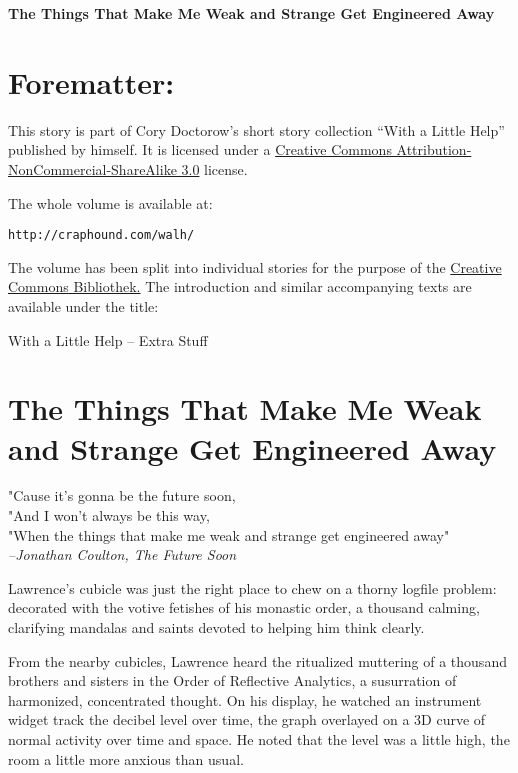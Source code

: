 


\begin{center}
\textbf{\huge\textsf{The Things That Make Me Weak and Strange Get 
Engineered Away}}
\end{center}

\section{Forematter:}
This story is part of Cory Doctorow’s short story collection
“With a Little Help” published by himself. It is licensed under a
\href{http://creativecommons.org/licenses/by-nc-sa/}
{Creative Commons Attribution-NonCommercial-ShareAlike 3.0} license.

The whole volume is available at:

\texttt{http://craphound.com/walh/}

The volume has been split into individual stories for the purpose of the
\href{http://ccbib.org}{Creative Commons Bibliothek.}
The introduction and similar accompanying texts are available under the 
title:
\begin{center}
With a Little Help -- Extra Stuff
\end{center}

\newpage
\section{The Things That Make Me Weak and Strange Get Engineered Away}

\begin{flushleft}
\textsf{
"Cause it's gonna be the future soon,\\
"And I won't always be this way,\\
"When the things that make me weak and strange get engineered away"\\
}
\hfill \textit{--Jonathan Coulton, The Future Soon}
\end{flushleft}

Lawrence's cubicle was just the right place to chew on a thorny logfile 
problem: decorated with the votive fetishes of his monastic order, a 
thousand calming, clarifying mandalas and saints devoted to helping him 
think clearly.

From the nearby cubicles, Lawrence heard the ritualized muttering of a 
thousand brothers and sisters in the Order of Reflective Analytics, a 
susurration of harmonized, concentrated thought. On his display, he 
watched an instrument widget track the decibel level over time, the 
graph overlayed on a 3D curve of normal activity over time and space. 
He noted that the level was a little high, the room a little more 
anxious than usual.

